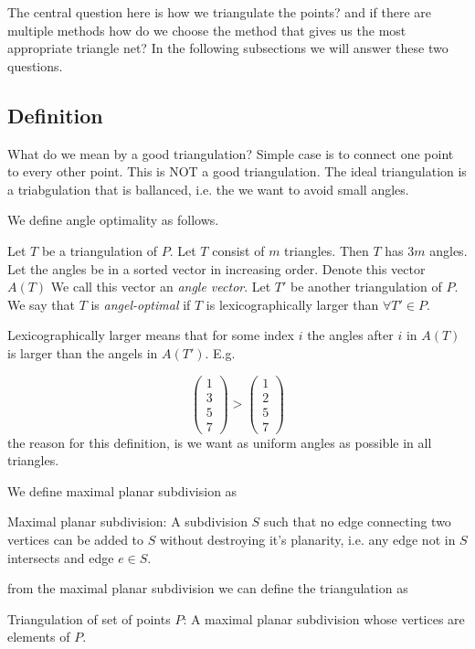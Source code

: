 \documentclass[10pt]{article}
\begin{document}
The central question here is how we triangulate the points? and if there are multiple methods how do we choose the method that gives us the most appropriate triangle net? In the following subsections we will answer these two questions.


\subsection{Definition} %
\label{sub:definition}

What do we mean by a good triangulation?
Simple case is to connect one point to every other point. This is NOT a good triangulation. The ideal triangulation is a triabgulation that is ballanced, i.e. the we want to avoid small angles. 

We define angle optimality as follows.

Let $T$ be a triangulation of $P$. Let $T$ consist of $m$ triangles. Then $T$ has $3m$ angles. Let the angles be in a sorted vector in increasing order. Denote this vector $A(T)$ We call this vector an \emph{angle vector}. Let $T'$ be another triangulation of $P$. We say that $T$ is \emph{angel-optimal} if $T$ is lexicographically larger than $\forall T'\in P$.

Lexicographically larger means that for some index $i$ the angles after $i$ in $A(T)$ is larger than the angels in $A(T')$. E.g.

\begin{equation} 
\left(
\begin{array}{r} 
   1  \\
   3 \\
   5 \\
   7 
\end{array} 
\right) >   
\left(
\begin{array}{r} 
   1  \\
   2 \\
   5 \\
   7 
\end{array} 
\right)
\end{equation} 
the reason for this definition, is we want as uniform angles as possible in all triangles.


We define maximal planar subdivision as
\begin{definition}
Maximal planar subdivision: A subdivision $S$ such that no edge connecting two vertices can be added to $S$ without destroying it's planarity, i.e. any edge not in $S$ intersects and edge $e \in S$.  
\end{definition}
from the maximal planar subdivision we can define the triangulation as
\begin{definition}
Triangulation of set of points $P$: A maximal planar subdivision whose vertices are elements of $P$.  
\end{definition}
\end{document}
